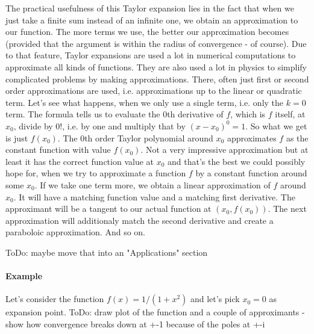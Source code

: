 



\medskip
The practical usefulness of this Taylor expansion lies in the fact that when we just take a finite sum instead of an infinite one, we obtain an approximation to our function. The more terms we use, the better our approximation becomes (provided that the argument is within the radius of convergence - of course). Due to that feature, Taylor expansions are used a lot in numerical computations to approximate all kinds of functions. They are also used a lot in physics to simplify complicated problems by making approximations. There, often just first or second order approximations are used, i.e. approximations up to the linear or quadratic term. Let's see what happens, when we only use a single term, i.e. only the $k=0$ term. The formula tells us to evaluate the $0$th derivative of $f$, which is $f$ itself, at $x_0$, divide by $0!$, i.e. by one and multiply that by $(x-x_0)^0 = 1$. So what we get is just $f(x_0)$. The $0$th order Taylor polynomial around $x_0$ approximates $f$ as the constant function with value $f(x_0)$. Not a very impressive approximation but at least it has the correct function value at $x_0$ and that's the best we could possibly hope for, when we try to approximate a function $f$ by a constant function around some $x_0$. If we take one term more, we obtain a linear approximation of $f$ around $x_0$. It will have a matching function value and a matching first derivative. The approximant will be a tangent to our actual function at $(x_0, f(x_0))$. The next approximation will additionaly match the second derivative and create a paraboloic approximation. And so on.

ToDo: maybe move that into an "Applications" section

\paragraph{Example} Let's consider the function $f(x) = 1 / (1 + x^2)$ and let's pick $x_0 = 0$ as expansion point. ToDo: draw plot of the function and a couple of approximants - show how convergence breaks down at +-1 because of the poles at +-i

